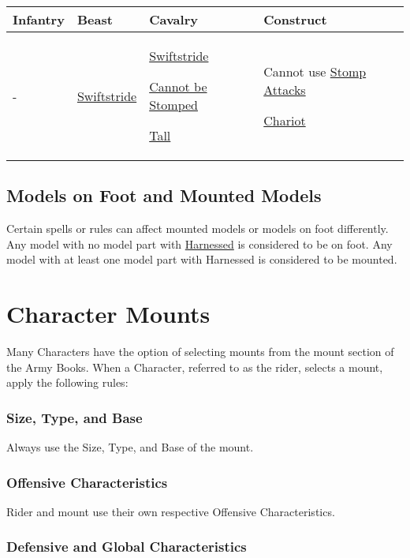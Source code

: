 \begin{center}
\begin{tabular}{P{2cm} P{3.5cm} P{3.5cm} P{5cm}}
  \textbf{Infantry} &
  \textbf{Beast} &
  \textbf{Cavalry} &
  \textbf{Construct} \\
  \midrule
  - &
  \hyperref[swiftstride]{Swiftstride} &
  \hyperref[swiftstride]{Swiftstride}\par
  \hyperref[cannot_be_stomped]{Cannot be Stomped}\par
  \hyperref[tall]{Tall} &
  Cannot use \hyperref[stomp_attacks]{Stomp Attacks}\par
  \hyperref[chariot]{Chariot}\\
\end{tabular}
\end{center}

\subsection{Models on Foot and Mounted Models}
\label{model_on_foot_and_mounted_models}

Certain spells or rules can affect mounted models or models on foot differently. Any model with no model part with \hyperref[harnessed]{Harnessed} is considered to be on foot. Any model with at least one model part with Harnessed is considered to be mounted.

\newpage
\section{Character Mounts}

Many Characters have the option of selecting mounts from the mount section of the Army Books. When a Character, referred to as the rider, selects a mount, apply the following rules:

\subsubsection{Size, Type, and Base}

Always use the Size, Type, and Base of the mount.

\subsubsection{Offensive Characteristics}

Rider and mount use their own respective Offensive Characteristics.

\subsubsection{Defensive and Global Characteristics}

